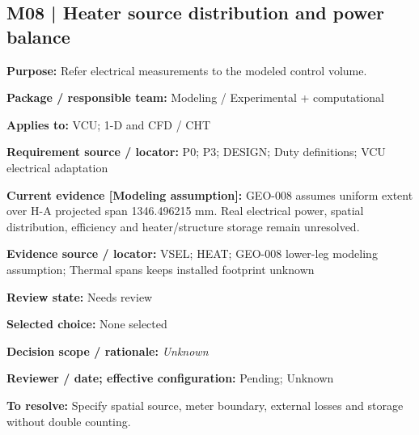 \documentclass[11pt]{article}
\begin{document}
\par\noindent\begin{minipage}{\textwidth}\small\setlength{\parskip}{2pt}
\subsection*{M08 | Heater source distribution and power balance}
\textbf{Purpose:} Refer electrical measurements to the modeled control volume.\par
\textbf{Package / responsible team:} Modeling / Experimental + computational\par
\textbf{Applies to:} VCU; 1-D and CFD / CHT\par
\textbf{Requirement source / locator:} P0; P3; DESIGN; Duty definitions; VCU electrical adaptation\par
\textbf{Current evidence [Modeling assumption]:} GEO-008 assumes uniform extent over H-A projected span 1346.496215 mm. Real electrical power, spatial distribution, efficiency and heater/structure storage remain unresolved.\par
\textbf{Evidence source / locator:} VSEL; HEAT; GEO-008 lower-leg modeling assumption; Thermal spans keeps installed footprint unknown\par
\textbf{Review state:} Needs review\par
\textbf{Selected choice:} None selected\par
\textbf{Decision scope / rationale:} \textit{Unknown}\par
\textbf{Reviewer / date; effective configuration:} Pending; Unknown\par
\textbf{To resolve:} Specify spatial source, meter boundary, external losses and storage without double counting.\par
\end{minipage}\par\vspace{5pt}
\end{document}
